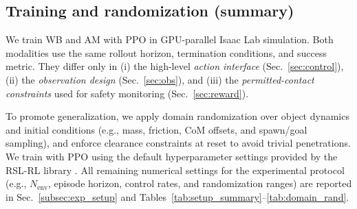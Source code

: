 \subsection{Training and randomization (summary)}
\label{sec:training_summary}
We train WB and AM with PPO in GPU-parallel Isaac Lab simulation. Both modalities use the same rollout horizon, termination conditions, and success metric.
They differ only in (i) the high-level \emph{action interface} (Sec.~\ref{sec:control}), (ii) the \emph{observation design} (Sec.~\ref{sec:obs}),
and (iii) the \emph{permitted-contact constraints} used for safety monitoring (Sec.~\ref{sec:reward}).

To promote generalization, we apply domain randomization over object dynamics and initial conditions (e.g., mass, friction, CoM offsets, and spawn/goal sampling),
and enforce clearance constraints at reset to avoid trivial penetrations. We train with PPO using the default hyperparameter settings provided by the RSL-RL library
\cite{schwarke2025rsl}. All remaining numerical settings for the experimental protocol (e.g., $N_{\text{env}}$, episode horizon, control rates, and randomization ranges)
are reported in Sec.~\ref{subsec:exp_setup} and Tables~\ref{tab:setup_summary}--\ref{tab:domain_rand}.